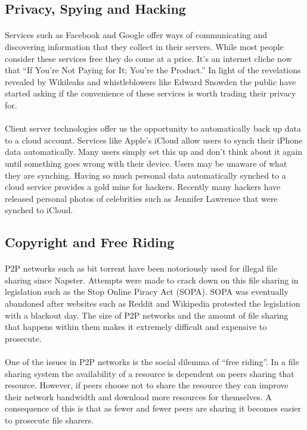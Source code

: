 \documentclass[11pt]{amsart}
\begin{document}
\subsection{Privacy, Spying and Hacking}
\paragraph{}
Services such as Facebook and Google offer ways of communicating and discovering information that they collect in their servers. While most people consider these services free they do come at a price. It's an internet cliche now that ``If You're Not Paying for It; You're the Product.'' In light of the revelations revealed by Wikileaks and whistleblowers like Edward Snowden the public have started asking if the convenience of these services is worth trading their privacy for.
\paragraph{}
Client server technologies offer us the opportunity to automatically back up data to a cloud account. Services like Apple's iCloud allow users to synch their iPhone data automatically. Many users simply set this up and don't think about it again until something goes wrong with their device. Users may be unaware of what they are synching. Having so much personal data automatically synched to a cloud service provides a gold mine for hackers. Recently many hackers have released personal photos of celebrities such as Jennifer Lawrence that were synched to iCloud.

\subsection{Copyright and Free Riding}
\paragraph{}
P2P networks such as bit torrent have been notoriously used for illegal file sharing since Napster. Attempts were made to crack down on this file sharing in legislation such as the Stop Online Piracy Act (SOPA). SOPA was eventually abandoned after websites such as Reddit and Wikipedia protested the legislation with a blackout day. The size of P2P networks and the amount of file sharing that happens within them makes it extremely difficult and expensive to prosecute.
\paragraph{}
One of the issues in P2P networks is the social dilemma of ``free riding''. In a file sharing system the availability of a resource is dependent on peers sharing that resource. However, if peers choose not to share the resource they can improve their network bandwidth and download more resources for themselves. A consequence of this is that as fewer and fewer peers are sharing it becomes easier to prosecute file sharers. \cite{FreeRiding}
\end{document}
